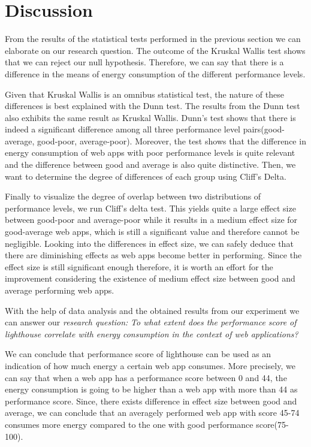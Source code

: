 \section{Discussion}
From the results of the statistical tests performed in the previous section we can elaborate on our research question. 
The outcome of the Kruskal Wallis test shows that we can reject our null hypothesis. Therefore, we can say that there is a difference in the means of energy consumption of the different performance levels. \newline

Given that Kruskal Wallis is an omnibus statistical test, the nature of these differences is best explained with the Dunn test. The results from the Dunn test also exhibits the same result as Kruskal Wallis. Dunn's test shows that there is indeed a significant difference among all three performance level pairs(good-average, good-poor, average-poor). Moreover, the test shows that the difference in energy consumption of web apps with poor performance levels is quite relevant and the difference between good and average is also quite distinctive. Then, we want to determine the degree of differences of each group using Cliff's Delta.
\newline

Finally to visualize the degree of overlap between two distributions of performance levels, we run Cliff's delta test. This yields quite a large effect size between good-poor and average-poor while it results in a medium effect size for good-average web apps, which is still a significant value and therefore cannot be negligible. Looking into the differences in effect size, we can safely deduce that there are diminishing effects as web apps become better in performing. Since the effect size is still significant enough therefore, it is worth an effort for the improvement considering the existence of medium effect size between good and average performing web apps.\newline

With the help of data analysis and the obtained results from our experiment we can answer our \textit{research question:}\newline
\textit{To what extent does the performance score of lighthouse correlate with energy consumption in the context of web applications?}\newline

We can conclude that performance score of lighthouse can be used as an indication of how much energy a certain web app consumes. More precisely, we can say that when a web app has a performance score between 0 and 44, the energy consumption is going to be higher than a web app with more than 44 as performance score. Since, there exists difference in effect size between good and average, we can conclude that an averagely performed web app with score 45-74 consumes more energy compared to the one with good performance score(75-100).\newline

